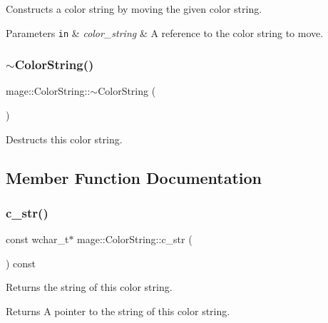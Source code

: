Constructs a color string by moving the given color string.


\begin{DoxyParams}[1]{Parameters}
\mbox{\tt in}  & {\em color\+\_\+string} & A reference to the color string to move. \\
\hline
\end{DoxyParams}
\hypertarget{structmage_1_1_color_string_a95886010269c8c4bc3a27fbfe829f4c2}{}\label{structmage_1_1_color_string_a95886010269c8c4bc3a27fbfe829f4c2} 
\subsubsection{\texorpdfstring{$\sim$\+Color\+String()}{~ColorString()}}
{\footnotesize\ttfamily mage\+::\+Color\+String\+::$\sim$\+Color\+String (\begin{DoxyParamCaption}{ }\end{DoxyParamCaption})\hspace{0.3cm}{\ttfamily [default]}}

Destructs this color string. 

\subsection{Member Function Documentation}
\hypertarget{structmage_1_1_color_string_a7de3a01551299c0df363adf0e8ecc304}{}\label{structmage_1_1_color_string_a7de3a01551299c0df363adf0e8ecc304} 
\subsubsection{\texorpdfstring{c\+\_\+str()}{c\_str()}}
{\footnotesize\ttfamily const wchar\+\_\+t$\ast$ mage\+::\+Color\+String\+::c\+\_\+str (\begin{DoxyParamCaption}{ }\end{DoxyParamCaption}) const}

Returns the string of this color string.

\begin{DoxyReturn}{Returns}
A pointer to the string of this color string. 
\end{DoxyReturn}
\hypertarget{structmage_1_1_color_string_a4bb550545996322face2c6c76787b861}{}\label{structmage_1_1_color_string_a4bb550545996322face2c6c76787b861} 
